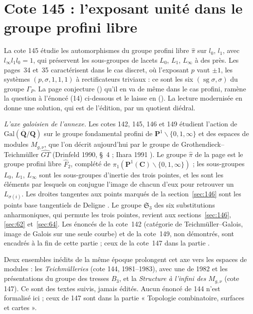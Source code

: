 \section[Cote 145 : l'exposant unité dans le groupe profini libre]{Cote 145 : l'exposant unité dans le groupe profini libre\protect{}}\label{sec:145}

La cote 145 étudie les automorphismes du groupe profini libre $\hat\pi$ sur $l_0$, $l_1$, avec $l_\infty l_1 l_0 = 1$, qui préservent les sous-groupes de lacets $L_0$, $L_1$, $L_\infty$ à des  près. Les pages~34 et~35 caractérisent dans le cas discret, où l'exposant $p$ vaut $\pm 1$, les systèmes $(p, \sigma, 1, 1, 1)$ à rectificateurs triviaux : ce sont les six $(\operatorname{sg}\sigma, \sigma)$ du groupe $\Gamma_P$. La page conjecture () qu'il en va de même dans le cas profini, ramène la question à l'énoncé (14) ci-dessous et le laisse en  (). La lecture modernisée en donne une solution, qui est de l'édition, par un quotient diédral.

\noindent\emph{L'axe galoisien de l'annexe.} Les cotes 142, 145, 146 et 149 étudient l'action de $\mathrm{Gal}(\overline{\mathbf Q}/\mathbf Q)$ sur le groupe fondamental profini de $\mathbf P^1 \smallsetminus \{0, 1, \infty\}$ et des espaces de modules $M_{g,\nu}$, que l'on décrit aujourd'hui par le groupe de Grothendieck--Teichmüller $\widehat{GT}$ (Drinfeld 1990, §~4 \cite{drinfeld1990} ; Ihara 1991 \cite{ihara1991}). Le groupe $\hat\pi$ de la page est le groupe profini libre $\hat F_2$, complété de $\pi_1(\mathbf P^1(\mathbf C) \smallsetminus \{0, 1, \infty\})$ ; les sous-groupes $L_0$, $L_1$, $L_\infty$ sont les sous-groupes d'inertie des trois pointes, et les  sont les éléments par lesquels on conjugue l'image de chacun d'eux pour retrouver un $L_{\sigma(i)}$. Les droites tangentes aux points marqués de la section~\ref{sec:146} sont les points base tangentiels de Deligne \cite{deligne1989}. Le groupe $\mathfrak S_3$ des six substitutions anharmoniques, qui permute les trois pointes, revient aux sections~\ref{sec:146}, \ref{sec:62} et~\ref{sec:64}. Les énoncés de la cote~142 (catégorie de Teichmüller--Galois, image de Galois sur une seule courbe) et de la cote~149, non démontrés, sont encadrés à la fin de cette partie ; ceux de la cote~147 dans la partie .

\noindent Deux ensembles inédits de la même époque prolongent cet axe vers les espaces de modules : les \emph{Teichmülleries} (cote 144, 1981--1983), avec une  de 1982 et les présentations du groupe des tresses $B_3$, et la \emph{Structure à l'infini des $M_{g,\nu}$} (cote 147). Ce sont des textes suivis, jamais édités. Aucun énoncé de 144 n'est formalisé ici ; ceux de 147 sont dans la partie « Topologie combinatoire, surfaces et cartes ».

